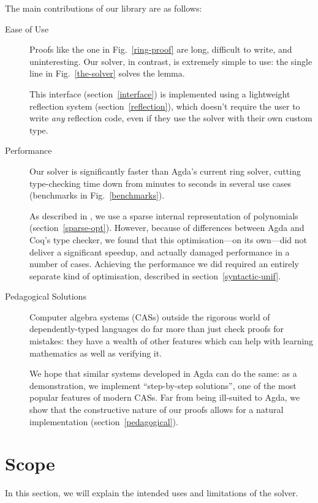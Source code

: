 \documentclass[acmsmall,review,anonymous]{acmart}\settopmatter{printfolios=true,printccs=false,printacmref=false}
\theoremstyle{remark}
\begin{document}
The main contributions of our library are as follows:
\begin{description}
  \item[Ease of Use] Proofs like the one in Fig.~\ref{ring-proof} are long,
    difficult to write, and uninteresting. Our solver, in contrast, is extremely
    simple to use: the single line in Fig.~\ref{the-solver} solves the lemma.

    This interface (section~\ref{interface}) is implemented using a lightweight
    reflection system (section~\ref{reflection}), which doesn't require the user
    to write \emph{any} reflection code, even if they use the solver with their
    own custom type. 
  \item[Performance] Our solver is significantly faster than Agda's current ring
    solver, cutting type-checking time down from minutes to seconds in several
    use cases (benchmarks in Fig.~\ref{benchmarks}).

    As described in \citet{gregoire_proving_2005}, we use a sparse internal
    representation of polynomials (section~\ref{sparse-opt}). However, because
    of differences between Agda and Coq's type checker, we found that this
    optimisation---on its own---did not deliver a significant speedup, and
    actually damaged performance in a number of cases. Achieving the performance
    we did required an entirely separate kind of optimisation, described in
    section~\ref{syntactic-unif}.
  \item[Pedagogical Solutions] Computer algebra systems (CASs) outside the
    rigorous world of dependently-typed languages do far more than just check
    proofs for mistakes: they have a wealth of other features which can help
    with learning mathematics as well as verifying it.

    We hope that similar systems developed in Agda can do the same: as a
    demonstration, we implement ``step-by-step solutions'', one of the most
    popular features of modern CASs. Far from being ill-suited to Agda, we show
    that the constructive nature of our proofs allows for a natural
    implementation (section~\ref{pedagogical}).
\end{description}
\section{Scope}
In this section, we will explain the intended uses and limitations of the
solver.
\end{document}
